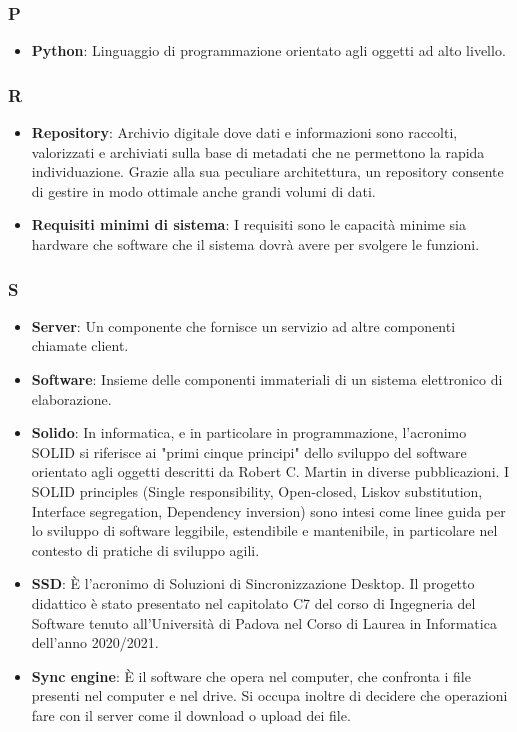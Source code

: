 \subsubsection*{P}
\begin{itemize}
	\item \textbf{Python}: Linguaggio di programmazione orientato agli oggetti ad alto livello.
\end{itemize}

\subsubsection*{R}
\begin{itemize}
	\item \textbf{Repository}: Archivio digitale dove dati e informazioni sono raccolti, valorizzati e archiviati sulla base di metadati che ne permettono la rapida individuazione. Grazie alla sua peculiare architettura, un repository consente di gestire in modo ottimale anche grandi volumi di dati.
	\item \textbf{Requisiti minimi di sistema}: I requisiti sono le capacità minime sia hardware che software che il sistema dovrà avere per svolgere le funzioni.
\end{itemize}

\subsubsection*{S}
\begin{itemize}
	\item \textbf{Server}: Un componente che fornisce un servizio ad altre componenti chiamate client.
	\item \textbf{Software}: Insieme delle componenti immateriali di un sistema elettronico di elaborazione.
	\item \textbf{Solido}: In informatica, e in particolare in programmazione, l'acronimo SOLID si riferisce ai "primi cinque principi" dello sviluppo del software orientato agli oggetti descritti da Robert C. Martin in diverse pubblicazioni. I SOLID principles (Single responsibility, Open-closed, Liskov substitution, Interface segregation, Dependency inversion) sono intesi come linee guida per lo sviluppo di software leggibile, estendibile e mantenibile, in particolare nel contesto di pratiche di sviluppo agili.
	\item \textbf{SSD}: È l'acronimo di Soluzioni di Sincronizzazione Desktop. Il progetto didattico è stato presentato nel capitolato C7 del corso di Ingegneria del Software tenuto all'Università di Padova nel Corso di Laurea in Informatica dell'anno 2020/2021.
	\item \textbf{Sync engine}: È il software che opera nel computer, che confronta i file presenti nel computer e nel drive. Si occupa inoltre di decidere che operazioni fare con il server come il download o upload dei file.
\end{itemize}

